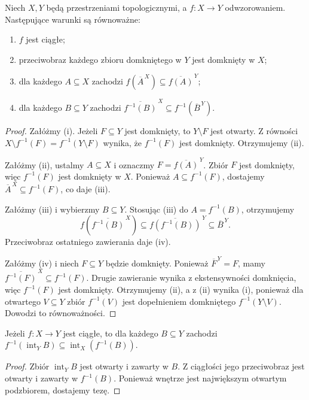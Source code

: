 \begin{twierdzenie}
\label{thm:topog-ciaglosc-kryteria-globalne}
Niech $X,Y$ będą przestrzeniami topologicznymi, a
$f\colon X\to Y$ odwzorowaniem. Następujące warunki są
równoważne:
\begin{enumerate}[label=(\roman*)]
\item $f$ jest ciągłe;
\item przeciwobraz każdego zbioru domkniętego w $Y$
      jest domknięty w $X$;
\item dla każdego $A\subseteq X$ zachodzi
      $f(\overline A^{\,X})\subseteq\overline{f(A)}^{\,Y}$;
\item dla każdego $B\subseteq Y$ zachodzi
      $\overline{f^{-1}(B)}^{\,X}\subseteq
        f^{-1}(\overline B^{\,Y})$.
\end{enumerate}
\end{twierdzenie}
\begin{proof}
Załóżmy (i). Jeżeli $F\subseteq Y$ jest domknięty, to
$Y\setminus F$ jest otwarty. Z równości
$X\setminus f^{-1}(F)=f^{-1}(Y\setminus F)$ wynika,
że $f^{-1}(F)$ jest domknięty. Otrzymujemy (ii).

Załóżmy (ii), ustalmy $A\subseteq X$ i oznaczmy
$F=\overline{f(A)}^{\,Y}$. Zbiór $F$ jest domknięty,
więc $f^{-1}(F)$ jest domknięty w $X$. Ponieważ
$A\subseteq f^{-1}(F)$, dostajemy
$\overline A^{\,X}\subseteq f^{-1}(F)$, co daje (iii).

Załóżmy (iii) i wybierzmy $B\subseteq Y$.
Stosując (iii) do $A=f^{-1}(B)$, otrzymujemy
\[
f(\overline{f^{-1}(B)}^{\,X})
 \subseteq\overline{f(f^{-1}(B))}^{\,Y}
 \subseteq\overline B^{\,Y}.
\]
Przeciwobraz ostatniego zawierania daje (iv).

Załóżmy (iv) i niech $F\subseteq Y$ będzie domknięty.
Ponieważ $\overline F^{\,Y}=F$, mamy
$\overline{f^{-1}(F)}^{\,X}\subseteq f^{-1}(F)$.
Drugie zawieranie wynika z ekstensywności domknięcia,
więc $f^{-1}(F)$ jest domknięty. Otrzymujemy (ii),
a z (ii) wynika (i), ponieważ dla otwartego $V\subseteq Y$
zbiór $f^{-1}(V)$ jest dopełnieniem domkniętego
$f^{-1}(Y\setminus V)$. Dowodzi to równoważności.
\end{proof}

\begin{stwierdzenie}
\label{prop:topog-ciaglosc-wnetrze}
Jeżeli $f\colon X\to Y$ jest ciągłe, to dla każdego
$B\subseteq Y$ zachodzi
$f^{-1}(\operatorname{int}_Y B)
 \subseteq\operatorname{int}_X(f^{-1}(B))$.
\end{stwierdzenie}
\begin{proof}
Zbiór $\operatorname{int}_Y B$ jest otwarty i zawarty w $B$.
Z ciągłości jego przeciwobraz jest otwarty i zawarty w
$f^{-1}(B)$. Ponieważ wnętrze jest największym otwartym
podzbiorem, dostajemy tezę.
\end{proof}

